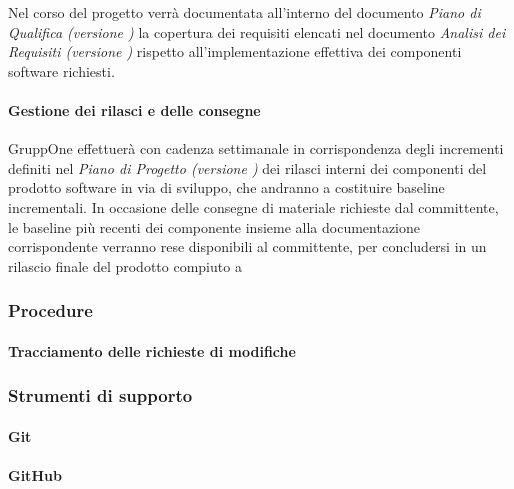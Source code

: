 \documentclass[../../norme-di-progetto.tex]{subfiles}
\begin{document}
Nel corso del progetto verrà documentata all'interno del documento \textit{Piano di Qualifica
  (versione \versione)} la copertura dei requisiti elencati nel documento \textit{Analisi dei Requisiti (versione \versione)} rispetto all'implementazione effettiva dei componenti software richiesti.


\paragraph{Gestione dei rilasci e delle consegne}%
\label{par:gestione_dei_rilasci_e_delle_consegne}

GruppOne effettuerà con cadenza settimanale in corrispondenza degli incrementi definiti nel \textit{Piano di Progetto (versione \versione)} dei rilasci interni dei componenti del prodotto software in via di sviluppo, che andranno a costituire baseline incrementali. In occasione delle consegne di materiale richieste dal committente, le baseline più recenti dei componente insieme alla documentazione corrispondente verranno rese disponibili al committente, per concludersi in un rilascio finale del prodotto compiuto a



\subsubsection{Procedure}%
\label{subs:gestione_della_configurazione/procedure}

\paragraph{Tracciamento delle richieste di modifiche}%
\label{par:tracciamento_delle_richieste_di_modifiche}



\subsubsection{Strumenti di supporto}%
\label{subs:gestione_della_configurazione/strumenti_di_supporto}

\paragraph{Git}%
\label{par:git}


\paragraph{GitHub}%
\label{par:github}

\end{document}
